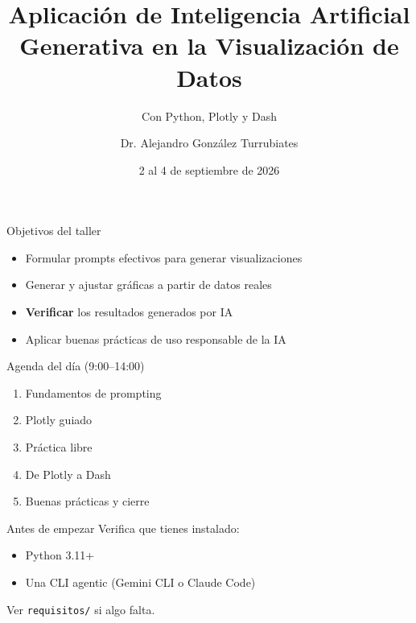 \documentclass[light,minted=false]{cuzbeamer} %
\title{Aplicación de Inteligencia Artificial Generativa en la Visualización de Datos}
\subtitle{Con Python, Plotly y Dash}
\author{Dr. Alejandro González Turrubiates}
\institute{Universidad Autónoma de Tamaulipas}
\date{2 al 4 de septiembre de 2026}
\begin{document}
    \maketitle

    \begin{frame}{Objetivos del taller}
        \begin{itemize}
            \item Formular prompts efectivos para generar visualizaciones
            \item Generar y ajustar gráficas a partir de datos reales
            \item \textbf{Verificar} los resultados generados por IA
            \item Aplicar buenas prácticas de uso responsable de la IA
        \end{itemize}
    \end{frame}

    \begin{frame}{Agenda del día (9:00--14:00)}
        \begin{enumerate}
            \item Fundamentos de prompting
            \item Plotly guiado
            \item Práctica libre
            \item De Plotly a Dash
            \item Buenas prácticas y cierre
        \end{enumerate}
    \end{frame}

    \begin{frame}{Antes de empezar}
        Verifica que tienes instalado:
        \begin{itemize}
            \item Python 3.11+
            \item Una CLI agentic (Gemini CLI o Claude Code)
        \end{itemize}

        \vspace{1em}
        Ver \texttt{requisitos/} si algo falta.
    \end{frame}
\end{document}
